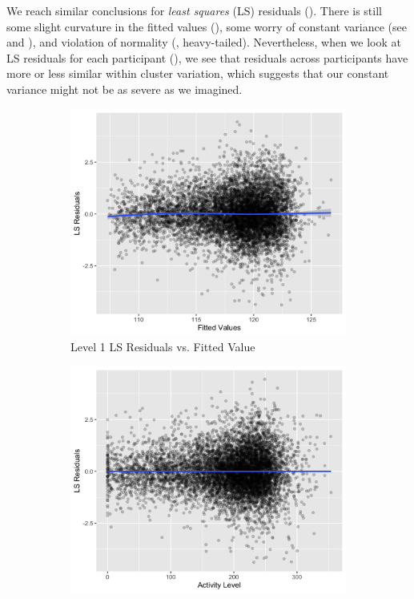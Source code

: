 \documentclass[12pt,twoside,letterpaper]{article}
\theoremstyle{definition}
\theoremstyle{definition}
\begin{document}
We reach similar conclusions for \emph{least squares} (LS) residuals (). There is still some slight curvature in the fitted values (), some worry of constant variance (see  and ), and violation of normality (, heavy-tailed). Nevertheless, when we look at LS residuals for each participant (), we see that residuals across participants have more or less similar within cluster variation, which suggests that our constant variance might not be as severe as we imagined. 
    \begin{figure}[H] 
        \centering
        \begin{subfigure}[b]{0.4\textwidth}
        \centering
        \includegraphics[width=\textwidth]{pics/ls resid fit.png}
        \caption[]%
        {{\small Level 1 LS Residuals vs. Fitted Value}}
        \label{fig: ls resid v fit}
        \end{subfigure}
        \hfill
        \begin{subfigure}[b]{0.4\textwidth}
        \centering
        \includegraphics[width=\textwidth]{pics/ls resid act.png}

\end{subfigure}
\end{figure}
\end{document}

